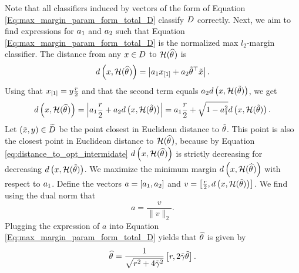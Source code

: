Note that all classifiers induced by vectors of the form of Equation \eqref{Eq:max_margin_param_form_total_D} classify $D$ correctly.  Next, we aim to find expressions for $a_1$ and $a_2$ such that Equation \eqref{Eq:max_margin_param_form_total_D} is the normalized max $l_2$-margin classifier. The distance from any $x \in D$ to $\mathcal{H}(\widehat{\theta}^{})$ is
\begin{equation*}
d\left(x,\mathcal{H}(\widehat{\theta}^{}) \right) = \left| a_1 x_{[1]}  + a_2 \tilde{\theta}^{\top} \tilde{x} \right|.
\end{equation*}
Using that $x_{[1]} = y \frac{r}{2}$ and that the second term equals $a_2 d\left(x, \mathcal{H}(\tilde{\theta})\right)$, we get
\begin{equation}
\label{eq:distance_to_opt_intermidate}
d\left(x,  \mathcal{H}(\widehat{\theta}^{})\right) =  \left| a_1 \frac{r}{2}  + a_2 d\left(x, \mathcal{H}(\tilde{\theta})\right) \right| = a_1 \frac{r}{2}  + \sqrt{1-a_1^2} d\left(x, \mathcal{H}(\tilde{\theta})\right).
\end{equation}
Let $(\tilde{x},y) \in \widetilde{D}$ be the point closest in Euclidean
distance to $\tilde{\theta}$. This point is also the closest point in
Euclidean distance to $\mathcal{H}(\widehat{\theta}^{})$, because by Equation
\eqref{eq:distance_to_opt_intermidate} $d\left(x,
\mathcal{H}(\widehat{\theta}^{})\right)$ is strictly decreasing for
decreasing $d\left(x, \mathcal{H}(\tilde{\theta})\right)$. We maximize
the minimum margin $d\left(x, \mathcal{H}(\widehat{\theta}^{}) \right)$ with
respect to $a_1$. Define the vectors $a = \left[a_1,
  a_2\right]$ and $v = \left[\frac{r}{2}, d\left(x,
  \mathcal{H}(\tilde{\theta})\right)\right]$. We find using the dual
norm that
\begin{equation*}
a = \frac{v}{\|v\|_2}.
\end{equation*}
Plugging the expression of $a$ into Equation
\eqref{Eq:max_margin_param_form_total_D} yields that $\widehat{\theta}^{}$ is
given by
\begin{equation*}
	\widehat{\theta}^{} = \frac{1}{\sqrt{r^2 + 4 \tilde{\gamma}^2}}\left[r,  2 \tilde{\gamma}\tilde{\theta} \right].
\end{equation*}

